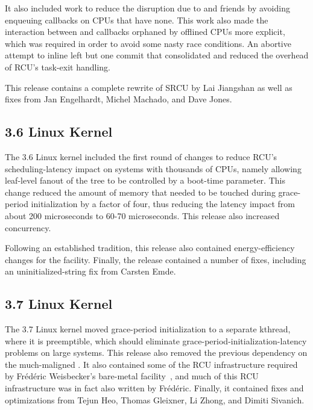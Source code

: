 It also included work to reduce the disruption due to 
and friends by avoiding enqueuing callbacks on CPUs that have none.
This work also made the interaction between  and
callbacks orphaned by offlined CPUs more explicit, which was required
in order to avoid some nasty race conditions.
An abortive attempt to inline  left but one
commit that consolidated and reduced the overhead of RCU's
task-exit handling.

This release contains a complete rewrite of SRCU by Lai Jiangshan as
well as fixes from Jan Engelhardt, Michel Machado, and Dave Jones.

\subsection{3.6 Linux Kernel}

The 3.6 Linux kernel included the first round of changes to reduce
RCU's scheduling-latency impact on systems with thousands of CPUs,
namely allowing leaf-level fanout of the  tree to be
controlled by a boot-time parameter.
This change reduced the amount of memory that needed to be touched
during grace-period initialization by a factor of four, thus reducing
the latency impact from about 200 microseconds to 60-70 microseconds.
This release also increased  concurrency.

Following an established tradition, this release also contained
energy-efficiency changes for the 
facility.
Finally, the release contained a number of fixes, including
an uninitialized-string fix from Carsten Emde.

\subsection{3.7 Linux Kernel}

The 3.7 Linux kernel moved grace-period initialization to a separate
kthread, where it is preemptible, which should eliminate
grace-period-initialization-latency problems on large systems.
This release also removed the previous  dependency
on the much-maligned .
It also contained some of the RCU infrastructure required by
Fr\'ed\'eric Weisbecker's  bare-metal
facility~\cite{JonCorbet2013NO-HZ-FULL}, and much of this RCU
infrastructure was in fact also written by Fr\'ed\'eric.
Finally, it contained fixes and optimizations from Tejun Heo,
Thomas Gleixner, Li Zhong, and Dimiti Sivanich.

